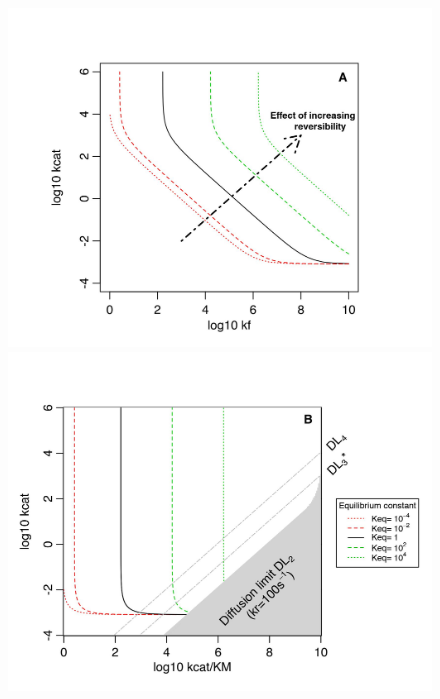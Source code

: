 \begin{figure}[h!]
\centering
\begin{minipage}[c]{0.49\linewidth}
\hspace{-1.3cm}
\includegraphics[scale=0.58,trim=0cm 0cm 0cm 1.5cm,clip]{pics/SM-Enzymes/2DFitLandscape_Multiple_Reverse.jpeg} 
\end{minipage} \hspace{-1.3cm}
\begin{minipage}[c]{0.49\linewidth}
\includegraphics[scale=0.58,trim=0cm 0cm 0cm 1.5cm,clip]{pics/SM-Enzymes/2DFitLandscape_Multiple_Reverse_exp_par.jpeg}

\end{minipage}
\end{figure}
